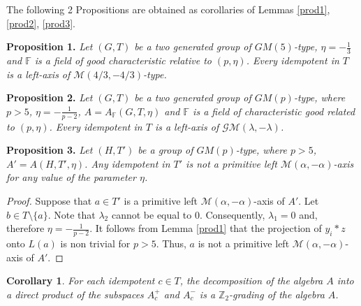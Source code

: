 \documentclass[12pt]{article}
\newcommand\F{\mathbb{F}}
\newcommand\Z{\mathbb{Z}}
\newcommand\al{\alpha}
\newcommand\lm{\lambda}
\newtheorem{cor}{Corollary}
\begin{document}

The following 2 Propositions are obtained as corollaries of Lemmas \ref{prod1}, \ref{prod2}, \ref{prod3}.

\bigskip
\noindent
\textbf{Proposition 1.} \textit{	Let $(G,T)$ be a two generated group of $GM(5)$-type, $\eta=-\frac{1}{3}$ and $\F$ is a field of good characteristic relative to $(p,\eta)$. Every idempotent in $T$ is a left-axis of $\mathcal M(4/3,-4/3)$-type.}

\bigskip
\noindent\textbf{Proposition 2.} \textit{	Let $(G,T)$ be a two generated group of $GM(p)$-type, where $p>5$, $\eta=-\frac{1}{p-2}$, $A=A_{\F}(G,T,\eta)$ and $\F$ is a field of characteristic good related to $(p,\eta)$. Every idempotent in $T$ is a left-axis of $\mathcal{GM}(\lm,-\lm)$.
}


\bigskip
\noindent\textbf{Proposition 3.} \textit{Let $(H,T')$ be a group of $GM(p)$-type, where $p>5$, $A'=A(H,T',\eta)$. Any idempotent in $T'$ is not a primitive left $\mathcal M(\al,-\al)$-axis for any value of the parameter $\eta $.}

\begin{proof}
	Suppose that $a\in T'$ is a primitive left $\mathcal M(\al,-\al)$-axis of $A'$. Let $b\in T\setminus\{a\}$. 
	Note that $\lm_2$ cannot be equal to $0$. Consequently, $\lm_1=0$ and, therefore $\eta=-\frac{1}{p-2}$. It follows from Lemma \ref{prod1} that the projection of $y_i*z$ onto $L(a)$ is non trivial for $p>5$. Thus, $a$ is not a primitive left $\mathcal M(\al,-\al)$-axis of $A'$.
\end{proof}	

\begin{cor}\label{twogenaxial}
	For each idempotent $c\in T$, the decomposition of the algebra $A$ into a direct product of the subspaces $A^+_c$ and $A^-_c$ is a $\Z_2$-grading of the algebra $A$.
\end{cor}
\end{document}
